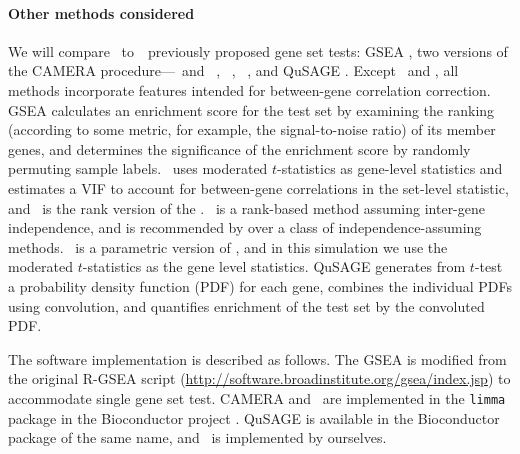 	
	\paragraph{Other methods considered}
	
	We will compare \OurMethod~to~\HowmanyTest~previously proposed gene set tests: GSEA
	\citep{subramanian2005gene}, two versions of the CAMERA procedure---\CMT~and
	\CMR~\citep{wu2012camera}, \gent~\citep{tian2005discovering}, 
	\genr~\citep{michaud2008integrative}, and QuSAGE \citep{yaari2013quantitative}. Except 
	\gent~and \genr, all methods incorporate features intended for between-gene correlation 
	correction. GSEA calculates an enrichment score for the test set by examining the ranking 
	(according to some metric, for example, the signal-to-noise ratio) of its member genes, and 
	determines the significance of the enrichment
	score by randomly permuting sample labels. \CMT~uses moderated $t$-statistics 
	\citep{Smyth2004moderated} as gene-level statistics and estimates a VIF to account for 
	between-gene correlations in the set-level statistic, and \CMR~is the rank version of the \CMT.
	\genr~is a rank-based method assuming inter-gene independence, and is recommended by 
	\citet{tarca2013comparison} over a class of independence-assuming methods. \gent~is a 
	parametric version of \genr, and in this simulation we use the moderated $t$-statistics as the 
	gene level statistics. 
	QuSAGE generates from $t$-test a probability density function (PDF) for each gene, combines the 
	individual PDFs using convolution, and quantifies enrichment of the test set by the convoluted 
	PDF. 
	
	
	The software implementation is described as follows. The GSEA is modified from the original 
	R-GSEA script (\url{http://software.broadinstitute.org/gsea/index.jsp}) to accommodate single 
	gene set test. CAMERA and \genr~are implemented in the \verb|limma| package 
	\citep{smyth2005limma} in the Bioconductor project \citep{gentleman2004bioconductor}. QuSAGE is 
	available in the Bioconductor package of the same name, and \gent~is implemented by ourselves. 
	

